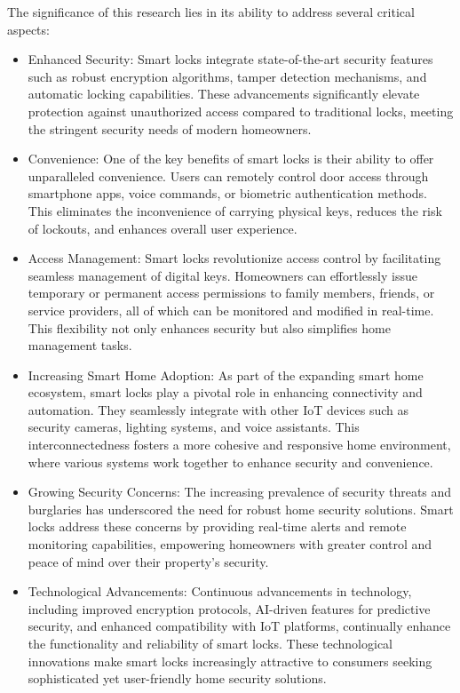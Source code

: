 \documentclass[conference, onecolumn]{IEEEtran}
\makeatletter
\def\subsection{\@startsection{subsection}{2}{\z@}{0.7ex plus 1ex minus 0.2ex}{0.5ex plus 0.2ex}{\normalfont\normalsize\bfseries}}
\makeatother
\begin{document}
\subsection{Necessity and Topicality}
The significance of this research lies in its ability to address several critical aspects:
\begin{itemize}
    \item Enhanced Security: Smart locks integrate state-of-the-art security features such as robust encryption algorithms, tamper detection mechanisms, and automatic locking capabilities. These advancements significantly elevate protection against unauthorized access compared to traditional locks, meeting the stringent security needs of modern homeowners.
    \item Convenience: One of the key benefits of smart locks is their ability to offer unparalleled convenience. Users can remotely control door access through smartphone apps, voice commands, or biometric authentication methods. This eliminates the inconvenience of carrying physical keys, reduces the risk of lockouts, and enhances overall user experience.
    \item Access Management: Smart locks revolutionize access control by facilitating seamless management of digital keys. Homeowners can effortlessly issue temporary or permanent access permissions to family members, friends, or service providers, all of which can be monitored and modified in real-time. This flexibility not only enhances security but also simplifies home management tasks.
    \item Increasing Smart Home Adoption: As part of the expanding smart home ecosystem, smart locks play a pivotal role in enhancing connectivity and automation. They seamlessly integrate with other IoT devices such as security cameras, lighting systems, and voice assistants. This interconnectedness fosters a more cohesive and responsive home environment, where various systems work together to enhance security and convenience.
    \item Growing Security Concerns: The increasing prevalence of security threats and burglaries has underscored the need for robust home security solutions. Smart locks address these concerns by providing real-time alerts and remote monitoring capabilities, empowering homeowners with greater control and peace of mind over their property's security.
    \item Technological Advancements: Continuous advancements in technology, including improved encryption protocols, AI-driven features for predictive security, and enhanced compatibility with IoT platforms, continually enhance the functionality and reliability of smart locks. These technological innovations make smart locks increasingly attractive to consumers seeking sophisticated yet user-friendly home security solutions.
\end{itemize}
\end{document}
